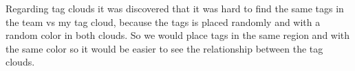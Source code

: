 Regarding tag clouds it was discovered that it was hard to find the same tags in the team vs my tag cloud, because the tags is placed randomly and with a random color in both clouds. So we would place tags in the same region and with the same color so it would be  easier to see the relationship between the tag clouds.


